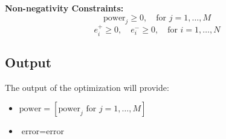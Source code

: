 \documentclass{article}
\begin{document}
\textbf{Non-negativity Constraints:}
\[
\text{power}_j \geq 0, \quad \text{for } j = 1, \ldots, M
\]
\[
e_i^+ \geq 0, \quad e_i^- \geq 0, \quad \text{for } i = 1, \ldots, N
\]

\subsection*{Output}
The output of the optimization will provide:
\begin{itemize}
    \item \( \text{power} = [\text{power}_j \text{ for } j = 1, \ldots, M] \)
    \item \( \text{error} = \text{error} \)
\end{itemize}
\end{document}
